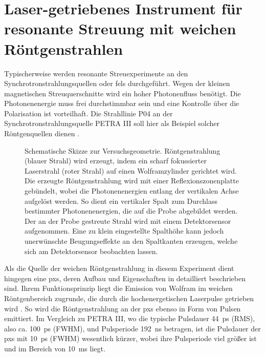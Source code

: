 \chapter{Laser-getriebenes Instrument für resonante Streuung mit weichen Röntgenstrahlen}
\label{text:quelle_roentgen}
Typischerweise werden resonante Streuexperimente an den Synchrotronstrahlungsquellen oder \gls{fel}s durchgeführt. Wegen der kleinen magnetischen Streuquerschnitte wird ein hoher Photonenfluss benötigt. Die Photonenenergie muss frei durchstimmbar sein und eine Kontrolle über die Polarisation ist vorteilhaft. Die Strahllinie P04 an der Synchrotronstrahlungsquelle PETRA III soll hier als Beispiel solcher Röntgenquellen dienen \cite{viefhaus_variable_2013}.
\begin{figure}[H]
    \centering
    
    \caption{Schematische Skizze zur Versuchsgeometrie. Röntgenstrahlung (blauer Strahl) wird erzeugt, indem ein scharf fokussierter Laserstrahl (roter Strahl) auf einen Wolframzylinder gerichtet wird. Die erzeugte Röntgenstrahlung wird mit einer Reflexionszonenplatte gebündelt, wobei die Photonenenergien entlang der vertikalen Achse aufgelöst werden. So dient ein vertikaler Spalt zum Durchlass bestimmter Photonenenergien, die auf die Probe abgebildet werden. Der an der Probe gestreute Strahl wird mit einem Detektorsensor aufgenommen. Eine zu klein eingestellte Spalthöhe kann jedoch unerwünschte Beugungseffekte an den Spaltkanten erzeugen, welche sich am Detektorsensor beobachten lassen.}
    \label{fig:pxs_aufbau}
\end{figure}
\noindent
Als die Quelle der weichen Röntgenstrahlung in diesem Experiment dient hingegen eine \gls{pxs}, deren Aufbau und Eigenschaften in \cite{schick_laser-driven_2021} detailliert beschrieben sind. Ihrem Funktionsprinzip liegt die Emission von Wolfram im weichen Röntgenbereich zugrunde, die durch die hochenergetischen Laserpulse getrieben wird \cite{mantouvalou_high_2015}. So wird die Röntgenstrahlung an der \gls{pxs} ebenso in Form von Pulsen emittiert. Im Vergleich zu PETRA III, wo die typische Pulsdauer \SI{44}{\pico\second} (RMS), also ca. \SI{100}{\pico\second} (FWHM), und Pulsperiode \SI{192}{\nano\second}  betragen, ist die Pulsdauer der \gls{pxs} mit \SI{10}{\pico\second} (FWHM) wesentlich kürzer, wobei ihre Pulsperiode viel größer ist und im Bereich von \SI{10}{\milli\second} liegt.
